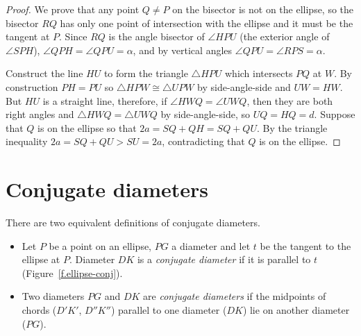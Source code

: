 \begin{proof} 
We prove that any point $Q\neq P$ on the bisector is not on the ellipse, so the bisector $RQ$ has only one point of intersection with the ellipse and it must be the tangent at $P$. Since $RQ$ is the angle bisector of $\angle HPU$ (the exterior angle of $\angle SPH$), $\angle QPH =\angle QPU=\alpha$, and by vertical angles $\angle QPU=\angle RPS=\alpha$.

Construct the line $HU$ to form the triangle $\triangle HPU$ which intersects $PQ$ at $W$. By construction $PH=PU$ so $\triangle HPW\cong \triangle UPW$ by side-angle-side and $UW=HW$. But $HU$ is a straight line, therefore, if $\angle HWQ=\angle UWQ$, then they are both right angles and $\triangle HWQ=\triangle UWQ$ by side-angle-side, so $UQ=HQ=d$. Suppose that $Q$ is on the ellipse so that $2a=SQ+QH=SQ+QU$. By the triangle inequality $2a=SQ+QU>SU=2a$, contradicting that $Q$ is on the ellipse.\hqed
\end{proof}



\section{Conjugate diameters}

\begin{definition}\label{def.conjugate}
There are two equivalent definitions of conjugate diameters.
\begin{itemize}
\item Let $P$ be a point on an ellipse, $PG$ a diameter and let $t$ be the tangent to the ellipse at $P$. Diameter $DK$ is a \emph{conjugate diameter} if it is parallel to $t$ (Figure~\ref{f.ellipse-conj}).
\item Two diameters $PG$ and $DK$ are \emph{conjugate diameters} if the midpoints of chords ($D'K'$, $D''K''$) parallel to one diameter ($DK$) lie on another diameter ($PG$).
\end{itemize}
\end{definition}


